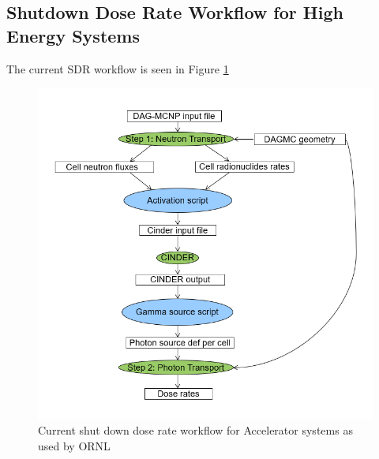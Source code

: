 \subsection{Shutdown Dose Rate Workflow for High Energy Systems}
The current SDR workflow is seen in Figure \ref{rnucs_r2s}
\begin{figure}[ht!]
\begin{centering}
\includegraphics[scale=0.4]{../figs/rnucs_r2s.png}
\caption{Current shut down dose rate workflow for Accelerator systems as used by ORNL}
\label{rnucs_r2s}
\end{centering}
\end{figure}

